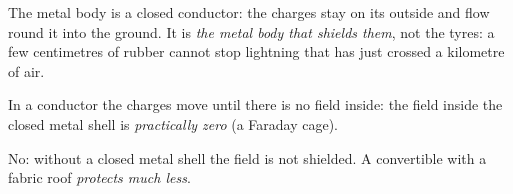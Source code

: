 \begin{abcliste}
\abc The metal body is a closed conductor: the charges stay on its outside and flow round it into the ground. It is \emph{the metal body that shields them}, not the tyres: a few centimetres of rubber cannot stop lightning that has just crossed a kilometre of air.

\abc In a conductor the charges move until there is no field inside: the field inside the closed metal shell is \emph{practically zero} (a Faraday cage).

\abc No: without a closed metal shell the field is not shielded. A convertible with a fabric roof \emph{protects much less}.
\end{abcliste}
